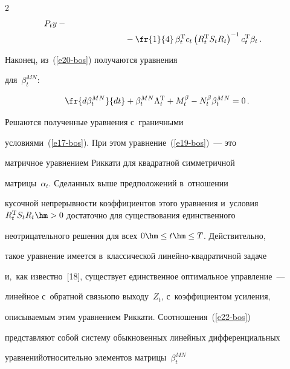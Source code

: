\begin{multicols}{2}
\begin{align*}
P_t y -{}\\


&\hspace*{24mm}{}-\fr{1}{4}\,\beta_t^{\mathrm{T}} c_t\left( R_t^{\mathrm{T}} S_t R_t\right)^{-1} c_t^{\mathrm{T}} \beta_t\,.


\end{align*}


   


        Наконец, из~(\ref{e20-bos}) получаются уравнения 


для~$\beta_t^{MN}$:


     \begin{equation}


     \fr{d\beta_t^{MN}}{dt}+\beta_t^{MN} \Lambda_t^{\mathrm{T}} +M_t^\beta -


N_t^\beta \beta_t^{MN} =0\,.


     \label{e22-bos}


\end{equation}





     Решаются полученные уравнения с~граничными  


условиями~(\ref{e17-bos}). При этом уравнение~(\ref{e19-bos})~--- это 


матричное уравнением Риккати для квадратной симметричной 


матрицы~$\alpha_t$. Сделанных выше предположений в~отношении 


кусочной непрерывности коэффициентов этого уравнения и~условия $R_t^{\mathrm{T}} 


S_t R_t\hm>0$ достаточно для существования единственного 


неотрицательного решения для всех $0\hm\leq t\hm\leq T$. Действительно, 


такое уравнение имеется в~классической ли\-ней\-но-квад\-ра\-тич\-ной задаче 


и,~как известно~[18], существует единственное оптимальное управление~--- 


линейное с~обратной связью\linebreak по выходу~$Z_t$, с~коэффициентом усиления, 


описываемым этим урав\-не\-ни\-ем Риккати. Соотноше\-ния~(\ref{e22-bos}) 


представляют собой сис\-те\-му обыкновен\-ных линейных дифференциальных 


урав\-не\-ний\linebreak относительно элементов матрицы~$\beta_t^{MN}$  



\end{multicols}
